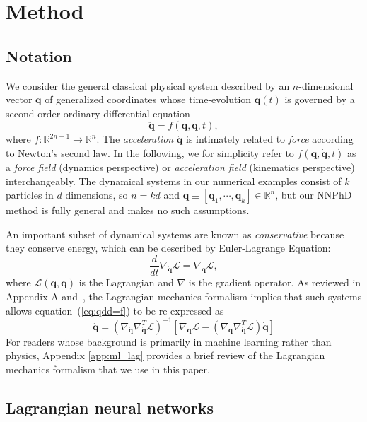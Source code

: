 \documentclass[aps,pre,reprint,superscriptaddress,nofootinbib,amsmath,amssymb]{revtex4-2}
\newcommand{\mat}[1]{\mathbf{#1}}
\newcommand{\q}{\mat{q}}
\newcommand{\qd}{\dot{\mat{q}}}
\newcommand{\qdd}{\ddot{\mat{q}}}
\newcommand{\lag}{\mathcal{L}}
\def\beq#1{\begin{equation}\label{#1}}
\def\eeq{\end{equation}}
\def\eq#1{equation~(\ref{#1})}
\begin{document}
\section{Method}
\label{MethodSec}

\subsection{Notation}

We consider the general classical physical system described by an $n$-dimensional vector $\mat{q}$ of generalized coordinates whose time-evolution $\mat{q}(t)$ is governed by 
a second-order ordinary differential equation
\begin{equation}\label{eq:qdd=f}
	\ddot{\mat{q}}=f(\mat{q},\dot{\mat{q}},t),
\end{equation}
where $f:\mathbb{R}^{2n+1}\to\mathbb{R}^n$.
The \textit{acceleration} $\qdd$ is intimately related to \textit{force} according to Newton's second law. In the following, we for simplicity refer to $f(\mat{q},\dot{\mat{q}},t)$ as a \textit{force field} (dynamics perspective) or \textit{acceleration field} (kinematics perspective) interchangeably.
The dynamical systems in our numerical examples consist of $k$ particles in $d$ dimensions, so $n=kd$ and $\mat{q}\equiv[\mat{q}_1,\cdots,\mat{q}_k]\in\mathbb{R}^{n}$, but our NNPhD method is fully general and makes no such assumptions.

An important subset of dynamical systems are known as {\it conservative} because they conserve energy, which can be described by Euler-Lagrange Equation:
\beq{EulerLagrangeEq}
\frac{d}{dt}\nabla_{\qd} \lag=\nabla_{\q}\lag,
\eeq
where $\lag(\q,\qd)$ is the Lagrangian and $\nabla$ is the gradient operator. As reviewed in Appendix A and~\cite{cranmer2020lagrangian}, the Lagrangian mechanics formalism implies that such systems allows \eq{eq:qdd=f}
to be re-expressed as 
\begin{equation}\label{eq:AL}
	\qdd = (\nabla_{\qd} \nabla_{\qd}^T\lag)^{-1}\left[\nabla_{\q}\lag-(\nabla_{\q}\nabla_{\qd}^T\lag)\qd\right]
\end{equation}
For readers whose background is primarily in machine learning rather than physics, Appendix \ref{app:ml_lag} provides a brief review of the Lagrangian mechanics formalism that we use in this paper.

\subsection{Lagrangian neural networks}
\end{document}
